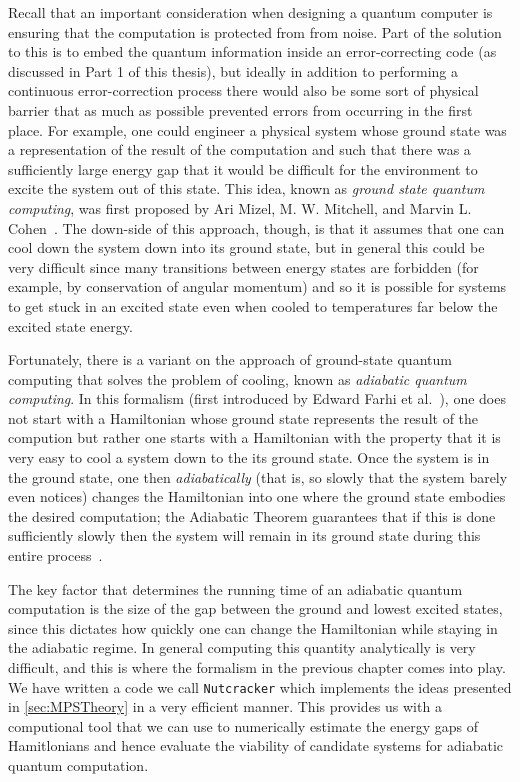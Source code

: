 \documentclass[12pt]{amsbook}
\theoremstyle{plain}
\theoremstyle{definition}
\theoremstyle{remark}
\begin{document}
Recall that an important consideration when designing a quantum computer is ensuring that the computation is protected from from noise.  Part of the solution to this is to embed the quantum information inside an error-correcting code (as discussed in Part 1 of this thesis), but ideally in addition to performing a continuous error-correction process there would also be some sort of physical barrier that as much as possible prevented errors from occurring in the first place.  For example, one could engineer a physical system whose ground state was a representation of the result of the computation and such that there was a sufficiently large energy gap that it would be difficult for the environment to excite the system out of this state.  This idea, known as \emph{ground state quantum computing}, was first proposed by Ari Mizel, M. W. Mitchell, and Marvin L. Cohen~\cite{PhysRevA.63.040302}.  The down-side of this approach, though, is that it assumes that one can cool down the system down into its ground state, but in general this could be very difficult since many transitions between energy states are forbidden (for example, by conservation of angular momentum) and so it is possible for systems to get stuck in an excited state even when cooled to temperatures far below the excited state energy.

Fortunately, there is a variant on the approach of ground-state quantum computing that solves the problem of cooling, known as \emph{adiabatic quantum computing}.  In this formalism (first introduced by Edward Farhi et al.~\cite{Farhi2000}), one does not start with a Hamiltonian whose ground state represents the result of the compution but rather one starts with a Hamiltonian with the property that it is very easy to cool a system down to the its ground state.   Once the system is in the ground state, one then \emph{adiabatically} (that is, so slowly that the system barely even notices) changes the Hamiltonian into one where the ground state embodies the desired computation;  the Adiabatic Theorem guarantees that if this is done sufficiently slowly then the system will remain in its ground state during this entire process~\cite{JPSJ.5.435}.

The key factor that determines the running time of an adiabatic quantum computation is the size of the gap between the ground and lowest excited states, since this dictates how quickly one can change the Hamiltonian while staying in the adiabatic regime.  In general computing this quantity analytically is very difficult, and this is where the formalism in the previous chapter comes into play.  We have written a code we call \texttt{Nutcracker} which implements the ideas presented in \ref{sec:MPSTheory} in a very efficient manner.  This provides us with a computional tool that we can use to numerically estimate the energy gaps of Hamitlonians and hence evaluate the viability of candidate systems for adiabatic quantum computation.
\end{document}
